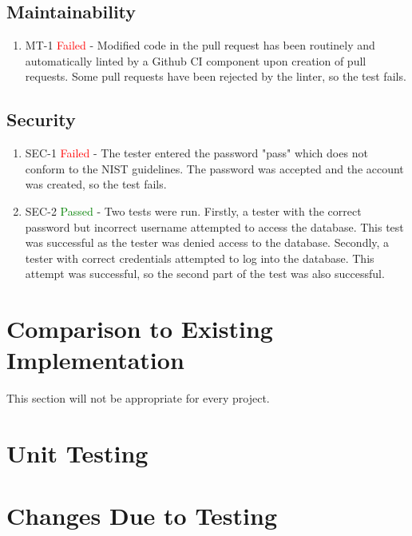 \documentclass[12pt, titlepage]{article}
\begin{document}
\subsection{Maintainability}
\begin{enumerate}
  \item MT-1 \textcolor{red}{Failed} - Modified code in the pull request has been routinely and automatically linted by a Github CI component upon creation of pull requests. Some pull requests have been rejected by the linter, so the test fails.
\end{enumerate}

\subsection{Security}
\begin{enumerate}
  \item SEC-1 \textcolor{red}{Failed} - The tester entered the password "pass" which does not conform to the NIST guidelines. The password was accepted and the account was created, so the test fails.
\item SEC-2 \textcolor{green}{Passed} - Two tests were run. Firstly, a tester with the correct password but incorrect username attempted to access the database. This test was successful as the tester was denied access to the database. Secondly, a tester with correct credentials attempted to log into the database. This attempt was successful, so the second part of the test was also successful.
\end{enumerate}

	
\section{Comparison to Existing Implementation}	

This section will not be appropriate for every project.

\section{Unit Testing}

\section{Changes Due to Testing}

\end{document}
